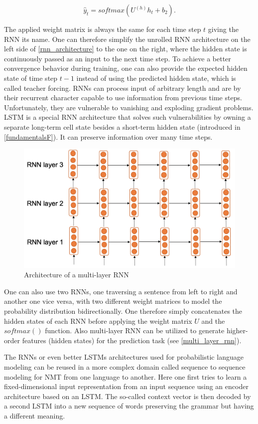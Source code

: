 \begin{equation}
	\hat{y}_t = softmax(U^{(h)} h_t + b_2).
\end{equation}

The applied weight matrix is always the same for each time step $t$ giving the \ac{RNN} its name. One can therefore simplify the unrolled \ac{RNN} architecture on the left side of \autoref{rnn_architecture} to the one on the right, where the hidden state is continuously passed as an input to the next time step. To achieve a better convergence behavior during training, one can also provide the expected hidden state of time step $t-1$ instead of using the predicted hidden state, which is called teacher forcing. \acp{RNN} can process input of arbitrary length and are by their recurrent character capable to use information from previous time steps. Unfortunately, they are vulnerable to vanishing and exploding gradient problems. \ac{LSTM} is a special \ac{RNN} architecture that solves such vulnerabilities by owning a separate long-term cell state besides a short-term hidden state (introduced in \autoref{fundamentalsF}). It can preserve information over many time steps. \cite{Gertz2020}

\begin{figure}[ht]
	\centering
	\includegraphics[width=0.6\linewidth]{figures/multi_layer_rnn.png}
	\caption{Architecture of a multi-layer  \ac{RNN} \cite[p. 87]{Gertz2020}}
	\label{multi_layer_rnn}
\end{figure}

One can also use two \acp{RNN}, one traversing a sentence from left to right and another one vice versa, with two different weight matrices to model the probability distribution bidirectionally. One therefore simply concatenates the hidden states of each \ac{RNN} before applying the weight matrix $U$ and the $softmax()$ function. Also multi-layer \acs{RNN} can be utilized to generate higher-order features (hidden states) for the prediction task (see \autoref{multi_layer_rnn}). \cite{Gertz2020}

The \acp{RNN} or even better \acp{LSTM} architectures used for probabilistic language modeling can be reused in a more complex domain called sequence to sequence modeling for \ac{NMT} from one language to another. Here one first tries to learn a fixed-dimensional input representation from an input sequence using an encoder architecture based on an \ac{LSTM}. The so-called context vector is then decoded by a second \ac{LSTM} into a new sequence of words preserving the grammar but having a different meaning. \cite{Sutskever2014}

